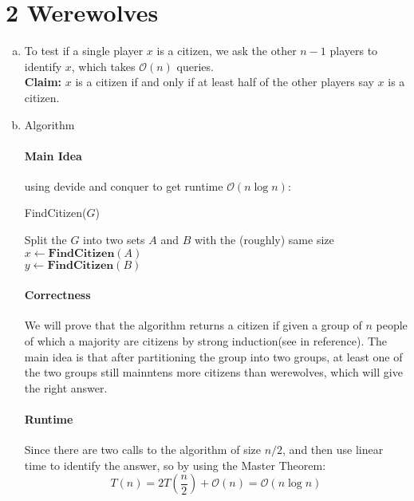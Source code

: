 \documentclass[11pt]{article}
\newenvironment{qparts}{\begin{enumerate}[(a)]}{\end{enumerate}}
\begin{document}
	\vspace{0.7cm}
	
	\section*{2 Werewolves}
	\begin{qparts}
		\item To test if a single player $x$ is a citizen, we ask the other $n-1$ players to identify  $x$, which takes $\mathcal{O}(n)$ queries.\\
		\textbf{Claim: } $x$ is a citizen if and only if at least half of the other players say $x$ is a citizen.
		
		\item Algorithm 
		\paragraph{Main Idea} using devide and conquer to get runtime $\mathcal{O}(n\log n)$:\\
		\begin{algorithm}[H]
			\caption{FindCitizen($G$) }
			Split the $G$ into two sets $A$ and $B$ with the (roughly) same size\\
			$x \leftarrow \textbf{FindCitizen}(A)$\\
			$y \leftarrow \textbf{FindCitizen}(B)$\\
		\end{algorithm}
		
		\paragraph{Correctness} We will prove that the algorithm returns a citizen if given a group of $n$ people of which a majority are citizens by strong induction(see in reference). The main idea is that after partitioning the group into two groups, at least one of the two groups still mainntens more citizens than werewolves, which will give the right answer.
		
		\paragraph{Runtime} Since there are two calls to the algorithm of size $n/2$, and then use linear time to identify the answer, so by using the Master Theorem:
		$$T(n) = 2T(\frac{n}{2}) + \mathcal{O}(n) = \mathcal{O}(n\log n)$$


\end{qparts}
\end{document}
